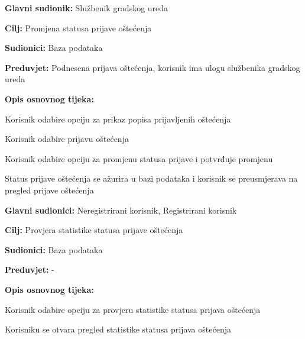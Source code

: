 \noindent {}
\begin{packed_item}

	\item \textbf{Glavni sudionik: }Službenik gradskog ureda
	\item  \textbf{Cilj:} Promjena statusa prijave oštećenja
	\item  \textbf{Sudionici:} Baza podataka
	\item  \textbf{Preduvjet:} Podnesena prijava oštećenja, korisnik ima ulogu službenika gradskog ureda
	\item  \textbf{Opis osnovnog tijeka:}

	\item[] \begin{packed_enum}

		\item Korisnik odabire opciju za prikaz popisa prijavljenih oštećenja
		\item Korisnik odabire prijavu oštećenja
		\item Korisnik odabire opciju za promjenu statusa prijave i potvrđuje promjenu
		\item Status prijave oštećenja se ažurira u bazi podataka i korisnik se preusmjerava na pregled prijave oštećenja
	\end{packed_enum}
\end{packed_item}


\noindent {}
\begin{packed_item}

	\item \textbf{Glavni sudionici: } Neregistrirani korisnik, Registrirani korisnik
	\item  \textbf{Cilj:} Provjera statistike statusa prijave oštećenja
	\item  \textbf{Sudionici:} Baza podataka
	\item  \textbf{Preduvjet:} -
	\item  \textbf{Opis osnovnog tijeka:}

	\item[] \begin{packed_enum}

		\item Korisnik odabire opciju za provjeru statistike statusa prijava oštećenja
		\item Korisniku se otvara pregled statistike statusa prijava oštećenja
	\end{packed_enum}
\end{packed_item}


